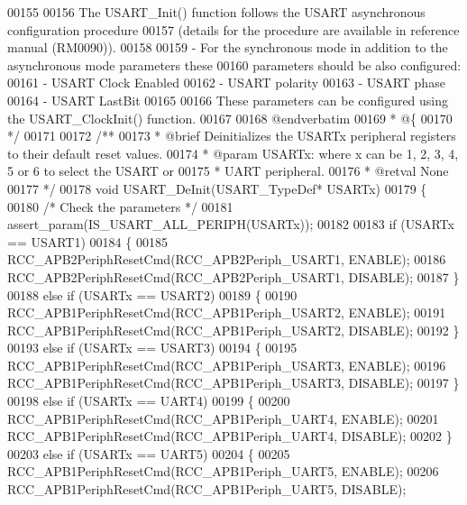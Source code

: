 \begin{DoxyCode}
00155 \textcolor{comment}{}
00156 \textcolor{comment}{  The USART\_Init() function follows the USART  asynchronous configuration procedure}
00157 \textcolor{comment}{  (details for the procedure are available in reference manual (RM0090)).}
00158 \textcolor{comment}{}
00159 \textcolor{comment}{  - For the synchronous mode in addition to the asynchronous mode parameters these }
00160 \textcolor{comment}{    parameters should be also configured:}
00161 \textcolor{comment}{        - USART Clock Enabled}
00162 \textcolor{comment}{        - USART polarity}
00163 \textcolor{comment}{        - USART phase}
00164 \textcolor{comment}{        - USART LastBit}
00165 \textcolor{comment}{  }
00166 \textcolor{comment}{  These parameters can be configured using the USART\_ClockInit() function.}
00167 \textcolor{comment}{}
00168 \textcolor{comment}{@endverbatim}
00169 \textcolor{comment}{  * @\{}
00170 \textcolor{comment}{  */}
00171 
00172 \textcolor{comment}{/**}
00173 \textcolor{comment}{  * @brief  Deinitializes the USARTx peripheral registers to their default reset values.}
00174 \textcolor{comment}{  * @param  USARTx: where x can be 1, 2, 3, 4, 5 or 6 to select the USART or }
00175 \textcolor{comment}{  *         UART peripheral.}
00176 \textcolor{comment}{  * @retval None}
00177 \textcolor{comment}{  */}
00178 \textcolor{keywordtype}{void} USART_DeInit(USART\_TypeDef* USARTx)
00179 \{
00180   \textcolor{comment}{/* Check the parameters */}
00181   assert_param(IS\_USART\_ALL\_PERIPH(USARTx));
00182 
00183   \textcolor{keywordflow}{if} (USARTx == USART1)
00184   \{
00185     RCC_APB2PeriphResetCmd(RCC_APB2Periph_USART1, ENABLE);
00186     RCC_APB2PeriphResetCmd(RCC_APB2Periph_USART1, DISABLE);
00187   \}
00188   \textcolor{keywordflow}{else} \textcolor{keywordflow}{if} (USARTx == USART2)
00189   \{
00190     RCC_APB1PeriphResetCmd(RCC_APB1Periph_USART2, ENABLE);
00191     RCC_APB1PeriphResetCmd(RCC_APB1Periph_USART2, DISABLE);
00192   \}
00193   \textcolor{keywordflow}{else} \textcolor{keywordflow}{if} (USARTx == USART3)
00194   \{
00195     RCC_APB1PeriphResetCmd(RCC_APB1Periph_USART3, ENABLE);
00196     RCC_APB1PeriphResetCmd(RCC_APB1Periph_USART3, DISABLE);
00197   \}
00198   \textcolor{keywordflow}{else} \textcolor{keywordflow}{if} (USARTx == UART4)
00199   \{
00200     RCC_APB1PeriphResetCmd(RCC_APB1Periph_UART4, ENABLE);
00201     RCC_APB1PeriphResetCmd(RCC_APB1Periph_UART4, DISABLE);
00202   \}
00203   \textcolor{keywordflow}{else} \textcolor{keywordflow}{if} (USARTx == UART5)
00204   \{
00205     RCC_APB1PeriphResetCmd(RCC_APB1Periph_UART5, ENABLE);
00206     RCC_APB1PeriphResetCmd(RCC_APB1Periph_UART5, DISABLE);

\end{DoxyCode}
